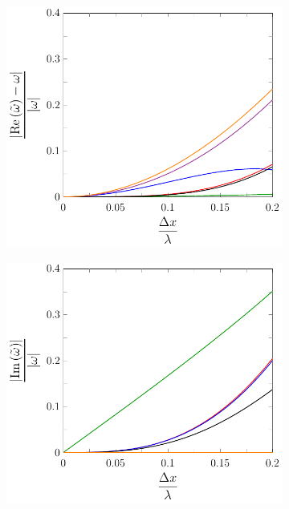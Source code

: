 \begin{figure}
	\centering
	\begin{subfigure}{0.5\textwidth}
		\includegraphics[width=\textwidth]{./chp4/figures/New/ReDispu0Shall.pdf}
	\end{subfigure}%
	\begin{subfigure}{0.5\textwidth}
		\includegraphics[width=\textwidth]{./chp4/figures/New/ImDispu0Shall.pdf}

\end{subfigure}
\end{figure}
